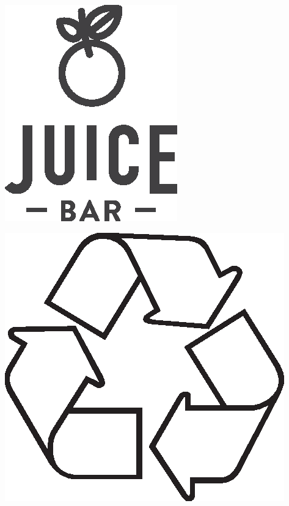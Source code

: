 
\thispagestyle{empty}
\noindent\begin{minipage}{0.1\textwidth}%
\includegraphics[width=\linewidth]{logo.eps}\par
    \begin{center}
% 
\includegraphics[width=0.2\linewidth]{recycling/recycling.eps}\par

    \end{center}

\end{minipage} \hfill 

